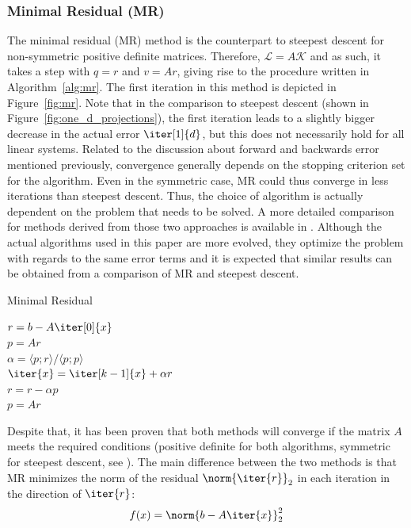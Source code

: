 \subsubsection{Minimal Residual (MR)}
\label{sec:mr}
The minimal residual (MR) method is the counterpart to steepest descent for non-symmetric positive definite matrices. Therefore, $\mathcal{L}=A\mathcal{K}$ and as such, it takes a step with $q=r$ and $v=Ar$, giving rise to the procedure written in Algorithm~\hyperref[alg:mr]{\ref{alg:mr}}. The first iteration in this method is depicted in Figure~\hyperref[fig:mr]{\ref{fig:mr}}. Note that in the comparison to steepest descent (shown in Figure~\hyperref[fig:one_d_projections]{\ref{fig:one_d_projections}}), the first iteration leads to a slightly bigger decrease in the actual error $\iter[1]{d}$, but this does not necessarily hold for all linear systems. Related to the discussion about forward and backwards error mentioned previously, convergence generally depends on the stopping criterion set for the algorithm. Even in the symmetric case, MR could thus converge in less iterations than steepest descent. Thus, the choice of algorithm is actually dependent on the problem that needs to be solved. A more detailed comparison for methods derived from those two approaches is available in \cite{chin_cg_2012}. Although the actual algorithms used in this paper are more evolved, they optimize the problem with regards to the same error terms and it is expected that similar results can be obtained from a comparison of MR and steepest descent.
 

\begin{algorithm}[h]
  \caption{Minimal Residual}
  \label{alg:mr}
  \SetAlgoLined
  \DontPrintSemicolon
  $r = b-A\iter[0]{x}$ \\
  $p = Ar$ \\
   {
    $\alpha = \langle p;r \rangle / \langle p;p \rangle$ \\
    $\iter{x} = \iter[k-1]{x}+\alpha r$ \\
    $r = r - \alpha p$ \\
    $p = Ar$ \\
  }
\end{algorithm}

Despite that, it has been proven that both methods will converge if the matrix $A$ meets the required conditions (positive definite for both algorithms, symmetric for steepest descent, see \cite{saad_iterative_2003}). The main difference between the two methods is that MR minimizes the norm of the residual $\norm{\iter{r}}_2$ in each iteration in the direction of $\iter{r}$:
\begin{equation}
    f(x) = \norm{b-A\iter{x}}_2^2    
\end{equation}

